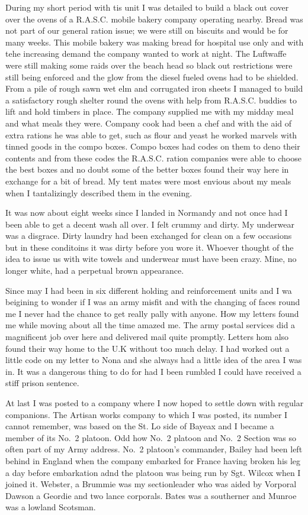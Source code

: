 During my short period with tis unit I was detailed to build a black
out cover over the ovens of a R.A.S.C. mobile bakery company operating
nearby. Bread was not part of our general ration issue; we were still
on biscuits and would be for many weeks. This mobile bakery was making
bread for hospital use only and with tehe increasing demand the
company wanted to work at night. The Luftwaffe were still making some
raids over the beach head so black out restrictions were still being
enforced and the glow from the diesel fueled ovens had to be
shielded. From a pile of rough sawn wet elm and corrugated iron sheets
I managed to build a satisfactory rough shelter round the ovens with
help from R.A.S.C. buddies to lift and hold timbers in place. The
company supplied me with my midday meal and what meals they
were. Company cook had been a chef and with the aid of extra rations
he was able to get, such as flour and yeast he worked marvels with
tinned goods in the compo boxes. Compo boxes had codes on them to deno
their contents and from these codes the R.A.S.C. ration companies were
able to choose the best boxes and no doubt some of the better boxes
found their way here in exchange for a bit of bread. My tent mates
were most envious about my meals when I tantalizingly described them
in the evening.

It was now about eight weeks since I landed in Normandy and not once
had I been able to get a decent wash all over. I felt crummy and
dirty. My underwear was a disgrace. Dirty laundry had been exchanged
for clean on a few occasions but in these conditoins it was dirty
before you wore it. Whoever thought of the idea to issue us with wite
towels and underwear must have been crazy. Mine, no longer white, had
a perpetual brown appearance.

Since may I had been in six different holding and reinforcement units
and I wa beigining to wonder if I was an army misfit and with the
changing of faces round me I never had the chance to get really pally
with anyone. How my letters found me while moving about all the time
amazed me. The army postal services did a magnificent job over here
and delivered mail quite promptly. Letters hom also found their way
home to the U.K without too much delay. I had worked out a little code
on my letter to Nona and she always had a little idea of the area I
was in. It was a dangerous thing to do for had I been rumbled I could
have received a stiff prison sentence.

At last I was posted to a company where I now hoped to settle down
with regular companions. The Artisan works company to which I was
posted, its number I cannot remember, was based on the St. Lo side of
Bayeax and I became a member of its No.~2 platoon. Odd how No.~2
platoon and No.~2 Section was so often part of my Army address. No.~2
platoon's commander, \lieutenant Bailey had been left behind in England when
the company embarked for France having broken his leg a day before
embarkation adnd the platoon was being run by Sgt. Wilcox when I
joined it. \Lsergeant Webster, a Brummie was my sectionleader who was aided
by Vorporal Dawson a Geordie and two lance corporals. \Lcorporal Bates was a
southerner and \Lcorporal Munroe was a lowland Scotsman.

